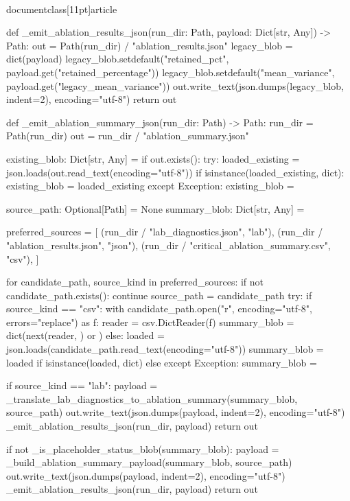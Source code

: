 \\documentclass[11pt]{article}
\begin{document}
\begin{CodeBlock}
def _emit_ablation_results_json(run_dir: Path, payload: Dict[str, Any]) -> Path:
    out = Path(run_dir) / "ablation_results.json"
    legacy_blob = dict(payload)
    legacy_blob.setdefault("retained_pct", payload.get("retained_percentage"))
    legacy_blob.setdefault("mean_variance", payload.get("legacy_mean_variance"))
    out.write_text(json.dumps(legacy_blob, indent=2), encoding="utf-8")
    return out


def _emit_ablation_summary_json(run_dir: Path) -> Path:
    run_dir = Path(run_dir)
    out = run_dir / "ablation_summary.json"

    existing_blob: Dict[str, Any] = {}
    if out.exists():
        try:
            loaded_existing = json.loads(out.read_text(encoding="utf-8"))
            if isinstance(loaded_existing, dict):
                existing_blob = loaded_existing
        except Exception:
            existing_blob = {}

    source_path: Optional[Path] = None
    summary_blob: Dict[str, Any] = {}

    preferred_sources = [
        (run_dir / "lab_diagnostics.json", "lab"),
        (run_dir / "ablation_results.json", "json"),
        (run_dir / "critical_ablation_summary.csv", "csv"),
    ]

    for candidate_path, source_kind in preferred_sources:
        if not candidate_path.exists():
            continue
        source_path = candidate_path
        try:
            if source_kind == "csv":
                with candidate_path.open("r", encoding="utf-8", errors="replace") as f:
                    reader = csv.DictReader(f)
                    summary_blob = dict(next(reader, {}) or {})
            else:
                loaded = json.loads(candidate_path.read_text(encoding="utf-8"))
                summary_blob = loaded if isinstance(loaded, dict) else {}
        except Exception:
            summary_blob = {}

        if source_kind == "lab":
            payload = _translate_lab_diagnostics_to_ablation_summary(summary_blob, source_path)
            out.write_text(json.dumps(payload, indent=2), encoding="utf-8")
            _emit_ablation_results_json(run_dir, payload)
            return out

        if not _is_placeholder_status_blob(summary_blob):
            payload = _build_ablation_summary_payload(summary_blob, source_path)
            out.write_text(json.dumps(payload, indent=2), encoding="utf-8")
            _emit_ablation_results_json(run_dir, payload)
            return out


\end{CodeBlock}
\end{document}
